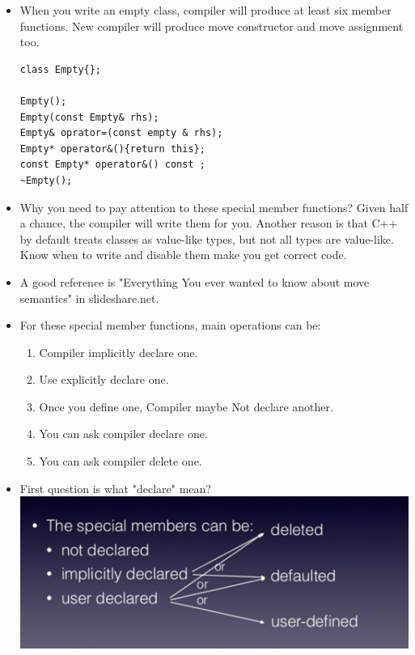 \documentclass[a4paper,11pt,twoside]{book}
\begin{document}
\begin{itemize}

\item When you write an empty class, compiler will produce at least six member functions.  New compiler will produce move constructor and move assignment too.
\begin{lstlisting}[numbers=none]
class Empty{};

Empty();
Empty(const Empty& rhs);
Empty& oprator=(const empty & rhs);
Empty* operator&(){return this};
const Empty* operator&() const ;
~Empty();
\end{lstlisting}

\item Why you need to pay attention to these special member functions?  Given half a chance, the compiler will write them for you. Another reason is that C++ by default treats classes as value-like types, but not all types are value-like. Know when to write and disable them make you get correct code.

\item A good reference is "Everything You ever wanted to know about move semantics" in slideshare.net.

\item For these special member functions, main operations can be:
\begin{enumerate}
\item Compiler implicitly declare one.
\item Use explicitly declare one.
\item Once you define one, Compiler maybe Not declare another.
\item You can ask compiler declare one.
\item You can ask compiler delete one.
\end{enumerate}

\item First question is what "declare" mean?  \\
\includegraphics[scale=0.6]{pics/sm1.png} \newline


\end{itemize}
\end{document}
